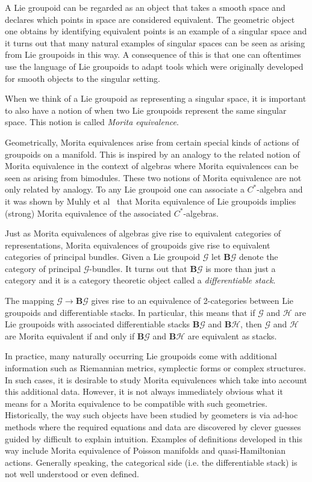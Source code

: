 \documentclass[11pt, letterpaper]{article}
\newcommand{\CG}{\mathcal{G}}
\renewcommand{\H}{\mathcal{H}}
\newcommand{\B}{\mathbf{B}}
\newcommand{\G}{\mathcal{G}}
\begin{document}
A Lie groupoid can be regarded as an object that takes a smooth space and declares which points in space are considered equivalent. The geometric object one obtains by identifying equivalent points is an example of a singular space and it turns out that many natural examples of singular spaces can be seen as arising from Lie groupoids in this way. A consequence of this is that one can oftentimes use the language of Lie groupoids to adapt tools which were originally developed for smooth objects to the singular setting.

When we think of a Lie groupoid as representing a singular space, it is important to also have a notion of when two Lie groupoids represent the same singular space. This notion is called \emph{Morita equivalence}.

Geometrically, Morita equivalences arise from certain special kinds of actions of groupoids on a manifold. 
This is inspired by an analogy to the related notion of Morita equivalence in the context of algebras where Morita equivalences can be seen as arising from bimodules. 
These two notions of Morita equivalence are not only related by analogy. To any Lie groupoid one can associate a \( C^*\)-algebra and it was shown by Muhly et al~\cite{AlgebraMorita} that Morita equivalence of Lie groupoids implies (strong) Morita equivalence of the associated \( C^*\)-algebras.

Just as Morita equivalences of algebras give rise to equivalent categories of representations, Morita equivalences of groupoids give rise to equivalent categories of principal bundles. Given a Lie groupoid \( \CG \) let \( \B \CG \) denote the category of principal \( \CG \)-bundles. It turns out that \( \B \CG \) is more than just a category and it is a category theoretic object called a \emph{differentiable stack}.

The mapping \( \CG \to \B \CG \) gives rise to an equivalence of 2-categories between Lie groupoids and differentiable stacks. In particular, this means that if \( \G \) and \( \H \) are Lie groupoids with associated differentiable stacks \( \B \G \) and \( \B \H \), then \( \G \) and \( \H \) are Morita equivalent if and only if \( \B \G \) and \( \B \H \) are equivalent as stacks.

In practice, many naturally occurring Lie groupoids come with additional information such as Riemannian metrics, symplectic forms or complex structures. In such cases, it is desirable to study Morita equivalences which take into account this additional data. However, it is not always immediately obvious what it means for a Morita equivalence to be compatible with such geometries. Historically, the way such objects have been studied by geometers is via ad-hoc methods where the required equations and data are discovered by clever guesses guided by difficult to explain intuition. Examples of definitions developed in this way include Morita equivalence of Poisson manifolds\cite{MR1138048} and quasi-Hamiltonian actions\cite{MR1638045}. Generally speaking, the categorical side (i.e. the differentiable stack) is not well understood or even defined.
\end{document}
